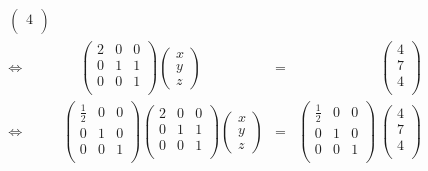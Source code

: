 \begin{example}
\begin{equation*}
\begin{array}{crcr}
\begin{pmatrix}
4\\
\end{pmatrix} 
\\[7mm]
\Leftrightarrow\ & %
\phantom{-}
\begin{pmatrix}
2 & 0 & 0 \\
0 & 1 & 1  \\ 
0& 0 & 1  \\
\end{pmatrix} 
\begin{pmatrix}
 x \\ 
y \\
z 
\end{pmatrix} 
&=&
\phantom{
\begin{pmatrix}
0 & 1 & 0  \\ 
1 & 0 & 0 \\
0& 0 & 1  \\
\end{pmatrix} 
}
~
\begin{pmatrix}
4 \\
7 \\ 
4\\
\end{pmatrix} 
\\[7mm]
\Leftrightarrow\ & %
\begin{pmatrix}
\frac12 & 0 & 0  \\ 
0 & 1 & 0 \\
0& 0 & 1  \\
\end{pmatrix} 
\begin{pmatrix}
2 & 0 & 0 \\
0 & 1 & 1  \\ 
0& 0 & 1  \\
\end{pmatrix} 
\begin{pmatrix}
 x \\ 
y \\
z 
\end{pmatrix} 
&=&
\begin{pmatrix}
\frac12 & 0 & 0  \\ 
0 & 1 &  0\\
0& 0 & 1  \\
\end{pmatrix} 
~
\begin{pmatrix}
4 \\
7 \\ 
4\\
\end{pmatrix} 
\\[7mm]

\end{array}
\end{equation*}
\end{example}
